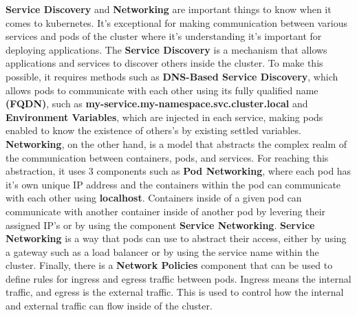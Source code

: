 \textbf{Service Discovery} and \textbf{Networking} are important things to know when it comes to kubernetes. It's exceptional for making communication between various services and pods of the cluster where it's understanding it's important for deploying applications. The \textbf{Service Discovery} is a mechanism that allows applications and services to discover others inside the cluster. To make this possible, it requires methods such as \textbf{DNS-Based Service Discovery}, which allows pods to communicate with each other using its fully qualified name \textbf{(FQDN)}, such as \textbf{my-service.my-namespace.svc.cluster.local} and \textbf{Environment Variables}, which are injected in each service, making pods enabled to know the existence of others's by existing settled variables. \textbf{Networking}, on the other hand, is a model that abstracts the complex realm of the communication between containers, pods, and services. For reaching this abstraction, it uses 3 components such as \textbf{Pod Networking}, where each pod has it's own unique IP address and the containers within the pod can communicate with each other using \textbf{localhost}. Containers inside of a given pod can communicate with another container inside of another pod by levering their assigned IP's or by using the component \textbf{Service Networking}. \textbf{Service Networking} is a way that pods can use to abstract their access, either by using a gateway such as a load balancer or by using the service name within the cluster. Finally, there is a \textbf{Network Policies} component that can be used to define rules for ingress and egress traffic between pods. Ingress means the internal traffic, and egress is the external traffic. This is used to control how the internal and external traffic can flow inside of the cluster.

